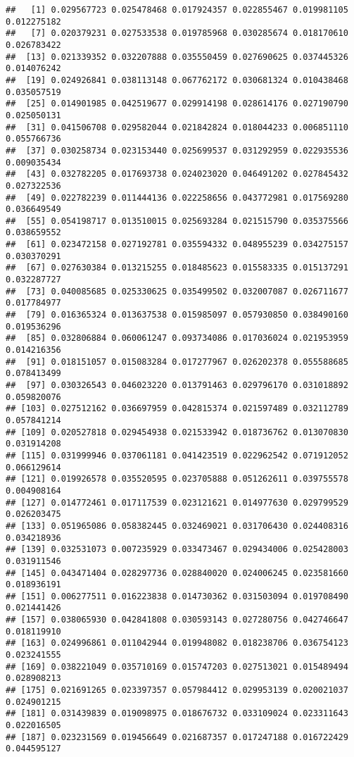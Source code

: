 \documentclass[
]{article}
\begin{document}
\begin{verbatim}
##   [1] 0.029567723 0.025478468 0.017924357 0.022855467 0.019981105 0.012275182
##   [7] 0.020379231 0.027533538 0.019785968 0.030285674 0.018170610 0.026783422
##  [13] 0.021339352 0.032207888 0.035550459 0.027690625 0.037445326 0.014076242
##  [19] 0.024926841 0.038113148 0.067762172 0.030681324 0.010438468 0.035057519
##  [25] 0.014901985 0.042519677 0.029914198 0.028614176 0.027190790 0.025050131
##  [31] 0.041506708 0.029582044 0.021842824 0.018044233 0.006851110 0.055766736
##  [37] 0.030258734 0.023153440 0.025699537 0.031292959 0.022935536 0.009035434
##  [43] 0.032782205 0.017693738 0.024023020 0.046491202 0.027845432 0.027322536
##  [49] 0.022782239 0.011444136 0.022258656 0.043772981 0.017569280 0.036649549
##  [55] 0.054198717 0.013510015 0.025693284 0.021515790 0.035375566 0.038659552
##  [61] 0.023472158 0.027192781 0.035594332 0.048955239 0.034275157 0.030370291
##  [67] 0.027630384 0.013215255 0.018485623 0.015583335 0.015137291 0.032287727
##  [73] 0.040085685 0.025330625 0.035499502 0.032007087 0.026711677 0.017784977
##  [79] 0.016365324 0.013637538 0.015985097 0.057930850 0.038490160 0.019536296
##  [85] 0.032806884 0.060061247 0.093734086 0.017036024 0.021953959 0.014216356
##  [91] 0.018151057 0.015083284 0.017277967 0.026202378 0.055588685 0.078413499
##  [97] 0.030326543 0.046023220 0.013791463 0.029796170 0.031018892 0.059820076
## [103] 0.027512162 0.036697959 0.042815374 0.021597489 0.032112789 0.057841214
## [109] 0.020527818 0.029454938 0.021533942 0.018736762 0.013070830 0.031914208
## [115] 0.031999946 0.037061181 0.041423519 0.022962542 0.071912052 0.066129614
## [121] 0.019926578 0.035520595 0.023705888 0.051262611 0.039755578 0.004908164
## [127] 0.014772461 0.017117539 0.023121621 0.014977630 0.029799529 0.026203475
## [133] 0.051965086 0.058382445 0.032469021 0.031706430 0.024408316 0.034218936
## [139] 0.032531073 0.007235929 0.033473467 0.029434006 0.025428003 0.031911546
## [145] 0.043471404 0.028297736 0.028840020 0.024006245 0.023581660 0.018936191
## [151] 0.006277511 0.016223838 0.014730362 0.031503094 0.019708490 0.021441426
## [157] 0.038065930 0.042841808 0.030593143 0.027280756 0.042746647 0.018119910
## [163] 0.024996861 0.011042944 0.019948082 0.018238706 0.036754123 0.023241555
## [169] 0.038221049 0.035710169 0.015747203 0.027513021 0.015489494 0.028908213
## [175] 0.021691265 0.023397357 0.057984412 0.029953139 0.020021037 0.024901215
## [181] 0.031439839 0.019098975 0.018676732 0.033109024 0.023311643 0.022016505
## [187] 0.023231569 0.019456649 0.021687357 0.017247188 0.016722429 0.044595127

\end{verbatim}
\end{document}
